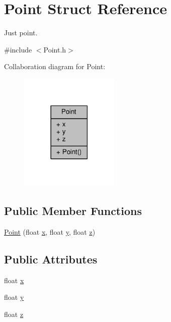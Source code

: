 \hypertarget{struct_point}{\section{Point Struct Reference}
\label{struct_point}
}


Just point.  




{\ttfamily \#include $<$Point.\-h$>$}



Collaboration diagram for Point\-:
\nopagebreak
\begin{figure}[H]
\begin{center}
\leavevmode
\includegraphics[width=134pt]{struct_point__coll__graph}
\end{center}
\end{figure}
\subsection*{Public Member Functions}
\begin{DoxyCompactItemize}
\item 
\hyperlink{struct_point_a405838cb39b8fb6119633d9ba7e6b4fb}{Point} (float \hyperlink{struct_point_a05dfe2dfbde813ad234b514f30e662f1}{x}, float \hyperlink{struct_point_a6101960c8d2d4e8ea1d32c9234bbeb8d}{y}, float \hyperlink{struct_point_a9a666531e0e99adff132be93d2407d0c}{z})
\end{DoxyCompactItemize}
\subsection*{Public Attributes}
\begin{DoxyCompactItemize}
\item 
float \hyperlink{struct_point_a05dfe2dfbde813ad234b514f30e662f1}{x}
\item 
float \hyperlink{struct_point_a6101960c8d2d4e8ea1d32c9234bbeb8d}{y}
\item 
float \hyperlink{struct_point_a9a666531e0e99adff132be93d2407d0c}{z}
\end{DoxyCompactItemize}


